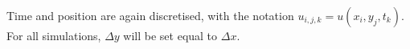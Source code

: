 Time and position are again discretised, with the notation \(u_{i,j,k} = u(x_i,y_j,t_k)\). For all simulations, \(\Delta y\) will be set equal to \(\Delta x\).





\clearpage


\clearpage


\clearpage


\clearpage

\clearpage
{}
\nocite{tveito2004introduction}
\printbibliography
\newpage





